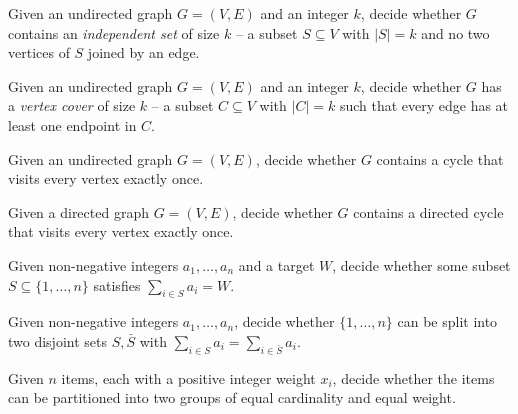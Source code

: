\begin{definition}
\label{def:independent_set}
Given an undirected graph $G = (V, E)$ and an integer $k$, decide whether $G$ contains an \emph{independent set} of size $k$ -- a subset $S \subseteq V$ with $|S| = k$ and no two vertices of $S$ joined by an edge.
\end{definition}

\begin{definition}
\label{def:vertex_cover}
Given an undirected graph $G = (V, E)$ and an integer $k$, decide whether $G$ has a \emph{vertex cover} of size $k$ -- a subset $C \subseteq V$ with $|C| = k$ such that every edge has at least one endpoint in $C$.
\end{definition}

\begin{definition}
\label{def:hamiltonian_cycle}
Given an undirected graph $G = (V, E)$, decide whether $G$ contains a cycle that visits every vertex exactly once.
\end{definition}

\begin{definition}
\label{def:dhc}
Given a directed graph $G = (V, E)$, decide whether $G$ contains a directed cycle that visits every vertex exactly once.
\end{definition}

\begin{definition}
\label{def:subset_sum}
Given non-negative integers $a_1, \dots, a_n$ and a target $W$, decide whether some subset $S \subseteq \{1, \dots, n\}$ satisfies $\sum_{i \in S} a_i = W$.
\end{definition}

\begin{definition}[Partition]
\label{def:partition}
Given non-negative integers $a_1, \dots, a_n$, decide whether $\{1, \dots, n\}$ can be split into two disjoint sets $S, \bar S$ with $\sum_{i \in S} a_i = \sum_{i \in \bar S} a_i$.
\end{definition}

\begin{definition}
\label{def:partition_special}
Given $n$ items, each with a positive integer weight $x_i$, decide whether the items can be partitioned into two groups of equal cardinality and equal weight.
\end{definition}

